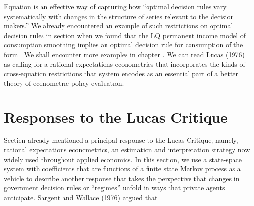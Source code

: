  Equation  is an effective way of capturing  how ``optimal decision rules vary systematically with changes in the structure of
 series relevant to the decision makers.''  We already  encountered an example of  such restrictions  on optimal decision rules in
 section  when we found that the LQ permanent income model of consumption smoothing implies an optimal decision rule
   for consumption of the form . We shall encounter  more examples  in chapter .
  We can read   Lucas (1976) as  calling for  a rational expectations econometrics that incorporates  the kinds of cross-equation
restrictions  that system  encodes as an essential part of a better theory of econometric policy 
evaluation.
%
%
%


\section{Responses to the Lucas Critique}\label{sec:lucascritique2}%
Section  already mentioned a principal response to the Lucas Critique,  namely,
rational expectations econometrics, an estimation and interpretation strategy now widely used throughout  applied economics.
In this section, we use a  state-space system with coefficients that are functions of a finite state Markov process 
as a vehicle to describe
another response
that takes the perspective that 
changes in  government  decision rules  or ``regimes''   
unfold in ways that private agents  anticipate.  %
Sargent and Wallace (1976) argued that


